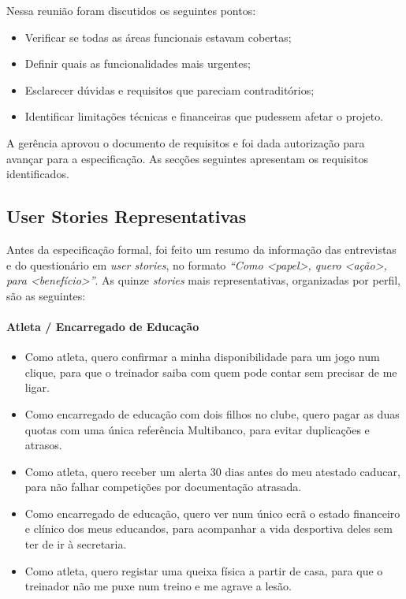 Nessa reunião foram discutidos os seguintes pontos:
\begin{itemize}
    \item Verificar se todas as áreas funcionais estavam cobertas;
    \item Definir quais as funcionalidades mais urgentes;
    \item Esclarecer dúvidas e requisitos que pareciam contraditórios;
    \item Identificar limitações técnicas e financeiras que pudessem afetar o projeto.
\end{itemize}

A gerência aprovou o documento de requisitos e foi dada autorização para avançar para a especificação. As secções seguintes apresentam os requisitos identificados.

\subsection{User Stories Representativas}\label{sec:user_stories}

Antes da especificação formal, foi feito um resumo da informação das entrevistas e do questionário em \textit{user stories}, no formato \emph{``Como \textless papel\textgreater, quero \textless ação\textgreater, para \textless benefício\textgreater''}. As quinze \textit{stories} mais representativas, organizadas por perfil, são as seguintes:

\paragraph{Atleta / Encarregado de Educação}
\begin{itemize}
    \item Como atleta, quero confirmar a minha disponibilidade para um jogo num clique, para que o treinador saiba com quem pode contar sem precisar de me ligar.
    \item Como encarregado de educação com dois filhos no clube, quero pagar as duas quotas com uma única referência Multibanco, para evitar duplicações e atrasos.
    \item Como atleta, quero receber um alerta 30 dias antes do meu atestado caducar, para não falhar competições por documentação atrasada.
    \item Como encarregado de educação, quero ver num único ecrã o estado financeiro e clínico dos meus educandos, para acompanhar a vida desportiva deles sem ter de ir à secretaria.
    \item Como atleta, quero registar uma queixa física a partir de casa, para que o treinador não me puxe num treino e me agrave a lesão.
\end{itemize}

